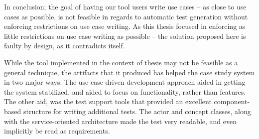 \noindent In conclusion; the goal of having our tool users write use cases -- as close to use cases as possible, is not feasible in regards to automatic test generation without enforcing restrictions on use case writing. As this thesis focused in enforcing as little restrictions on use case writing as possible -- the solution proposed here is faulty by design, as it contradicts itself.\medskip

\noindent While the tool implemented in the context of thesis may not be feasible as a general technique, the artifacts that it produced has helped the case study system in two major ways: The use case driven development approach aided in getting the system stabilized, and aided to focus on functionality, rather than features. The other aid, was the test support tools that provided an excellent component-based structure for writing additional tests. The actor and concept classes, along with the service-oriented architecture made the test very readable, and even implicitly be read as requirements.
